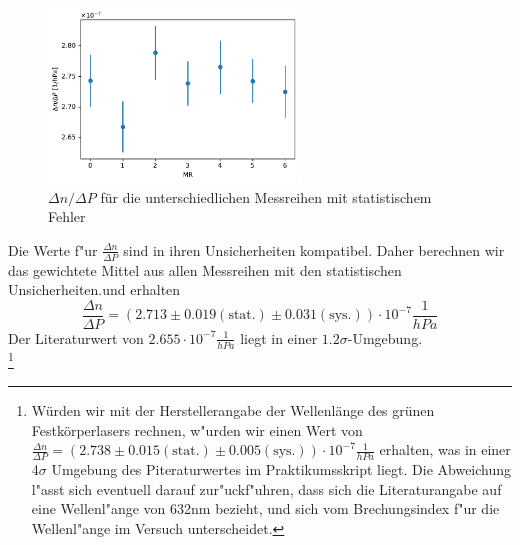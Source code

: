 \documentclass[12pt,a4paper]{article}
\begin{document}
\begin{figure}[H]
	\centering
	\includegraphics[width=0.6\textwidth]{Python/Methode1_Ergebnisse.pdf}
	\caption{$\Delta n/\Delta P$ für die unterschiedlichen Messreihen mit statistischem Fehler}
	\label{Methode1_dndP}
\end{figure}

Die Werte f"ur $\frac{\Delta n}{\Delta P}$ sind in ihren Unsicherheiten kompatibel. Daher berechnen wir das gewichtete Mittel aus allen Messreihen mit den statistischen Unsicherheiten.und erhalten
\begin{equation}
\frac{\Delta n}{\Delta P}=(2.713\pm 0.019(\text{stat.})\pm 0.031(\text{sys.}))\cdot10^{-7}\frac{1}{hPa}
\end{equation}
Der Literaturwert von $2.655\cdot10^{-7}\frac{1}{hPa}$ liegt in einer $1.2\sigma$-Umgebung.\\
\footnote{Würden wir mit der Herstellerangabe der Wellenlänge des grünen Festkörperlasers rechnen, w"urden wir einen Wert von $\frac{\Delta n}{\Delta P}=(2.738\pm 0.015(\text{stat.})\pm 0.005(\text{sys.}))\cdot10^{-7}\frac{1}{hPa}$ erhalten, was in einer 4$\sigma$ Umgebung des Piteraturwertes im Praktikumsskript liegt. Die Abweichung l"asst sich eventuell darauf zur"uckf"uhren, dass sich die Literaturangabe auf eine Wellenl"ange von 632nm bezieht, und sich vom Brechungsindex f"ur die Wellenl"ange im Versuch unterscheidet.}
\end{document}

